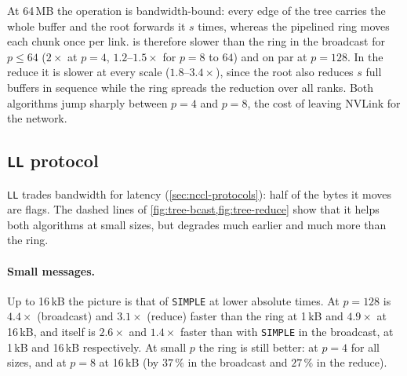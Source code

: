 At 64\,MB the operation is bandwidth-bound: every edge of the tree carries the whole buffer and the root forwards it $s$ times, whereas the pipelined ring moves each chunk once per link.
\bine{} is therefore slower than the ring in the broadcast for $p\le64$ ($2\times$ at $p=4$, $1.2$--$1.5\times$ for $p=8$ to $64$) and on par at $p=128$.
In the reduce it is slower at every scale ($1.8$--$3.4\times$), since the root also reduces $s$ full buffers in sequence while the ring spreads the reduction over all ranks.
Both algorithms jump sharply between $p=4$ and $p=8$, the cost of leaving NVLink for the network.

\subsection{\texttt{LL} protocol}\label{sec:tree-ll}

\texttt{LL} trades bandwidth for latency (\cref{sec:nccl-protocols}): half of the bytes it moves are flags.
The dashed lines of \cref{fig:tree-bcast,fig:tree-reduce} show that it helps both algorithms at small sizes, but degrades \bine{} much earlier and much more than the ring.

\paragraph{Small messages.}
Up to 16\,kB the picture is that of \texttt{SIMPLE} at lower absolute times.
At $p=128$ \bine{} is $4.4\times$ (broadcast) and $3.1\times$ (reduce) faster than the ring at 1\,kB and $4.9\times$ at 16\,kB, and \bine{} itself is $2.6\times$ and $1.4\times$ faster than with \texttt{SIMPLE} in the broadcast, at 1\,kB and 16\,kB respectively.
At small $p$ the ring is still better: at $p=4$ for all sizes, and at $p=8$ at 16\,kB (by $37\,\%$ in the broadcast and $27\,\%$ in the reduce).

